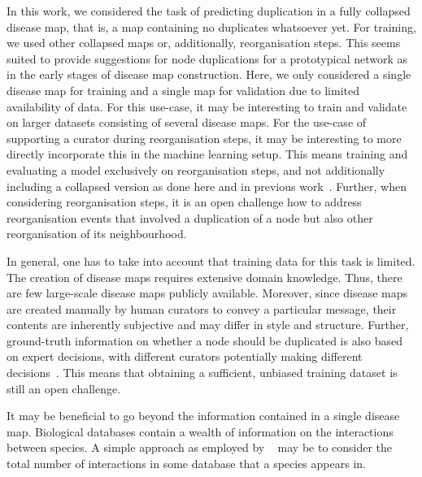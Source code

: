 \documentclass[
	fontsize=10pt, %
	twoside=true, %
	secnumdepth=1, %
  toc=indentunnumbered %
]{kaobook}
\begin{document}


In this work, we considered the task of predicting
duplication in a fully collapsed disease map, that is, a map containing no
duplicates whatsoever yet. For training, we used other collapsed maps or,
additionally, reorganisation steps. This seems suited to provide suggestions for
node duplications for a prototypical network as in the early stages of disease
map construction. Here, we only considered a single disease map for training and
a single map for validation due to limited availability of data. 
For this use-case, it may be
interesting to train and validate on larger datasets consisting of several
disease maps.
%
For the use-case of supporting a curator during reorganisation
steps, it may be interesting to more directly incorporate this in the machine
learning setup. This means training and evaluating a model exclusively on
reorganisation steps, and not additionally including a collapsed version as done
here and in previous work~\cite{nielsen_MachineLearningSupport_2019}.
%
Further, when considering reorganisation steps, it is an open challenge how to address
reorganisation events that involved a duplication of a node but also other
reorganisation of its neighbourhood.

In general, one has to take into account that training data for this task is
limited. The creation of disease maps requires extensive domain
knowledge. Thus, there are few large-scale disease maps publicly available.
Moreover, since disease maps are created manually by human curators to convey a
particular message, their contents are inherently subjective and may differ in
style and structure. Further, ground-truth information on whether a node should
be duplicated is also based on expert decisions, with different curators
potentially making different
decisions~\cite{nielsen_MachineLearningSupport_2019}. This means that obtaining
a sufficient, unbiased training dataset is still an open challenge.

It may be beneficial to go beyond the information contained in a single
disease map. Biological databases contain a wealth of information on the
interactions between species. A simple approach as employed by
\citeauthor{direks_DynamicVisualizationMetabolic_2014}~\cite{direks_DynamicVisualizationMetabolic_2014}
may be to consider the total number of interactions in some database that a
species appears in.
\end{document}
